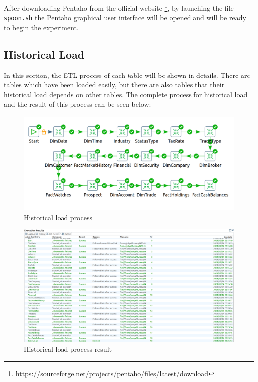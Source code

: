 \documentclass{article}
\newcommand\pcw[1]{\texttt{#1}}
\begin{document}
After downloading Pentaho from the official website \footnote{https://sourceforge.net/projects/pentaho/files/latest/download}, by launching the file \pcw{spoon.sh} the Pentaho graphical user interface will be opened and will be ready to begin the experiment.




\subsection{Historical Load}

In this section, the ETL process of each table will be shown in details. There are tables which have been loaded easily, but there are also tables that their historical load depends on other tables. The complete process for historical load and the result of this process can be seen below:
\begin{figure}[H] 
\begin{center}
\includegraphics[width=15cm, height=5cm]{images2/ALLL.png}
\end{center}
\caption{Historical load process}
\label{DimBroker}
\end{figure} 

\begin{figure}[H] 
\begin{center}
\includegraphics[width=15cm]{images2/ALLRES.png}
\end{center}
\caption{Historical load process result}
\label{DimBroker}
\end{figure} 
\end{document}
